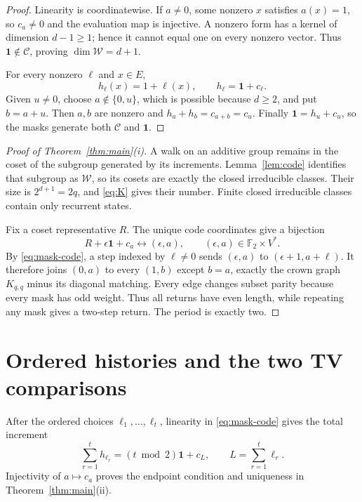 \documentclass[a4paper,10pt]{amsart}
\theoremstyle{remark}
\newcommand{\F}{\mathbb F}
\newcommand{\one}{\mathbf 1}
\newcommand{\cC}{\mathcal C}
\newcommand{\cW}{\mathcal W}
\begin{document}
\begin{proof}
Linearity is coordinatewise.  If $a\ne0$, some nonzero $x$ satisfies
$a(x)=1$, so $c_a\ne0$ and the evaluation map is injective.  A nonzero form
has a kernel of dimension $d-1\ge1$; hence it cannot equal one on every
nonzero vector.  Thus $\one\notin\cC$, proving $\dim\cW=d+1$.

For every nonzero $\ell$ and $x\in E$,
\begin{equation}\label{eq:mask-code}
          h_\ell(x)=1+\ell(x),\qquad h_\ell=\one+c_\ell.
\end{equation}
Given $u\ne0$, choose $a\notin\{0,u\}$, which is possible because $d\ge2$,
and put $b=a+u$.  Then $a,b$ are nonzero and
$h_a+h_b=c_{a+b}=c_u$.  Finally $\one=h_u+c_u$, so the masks generate both
$\cC$ and $\one$.
\end{proof}

\begin{proof}[Proof of Theorem~\ref{thm:main}(i)]
A walk on an additive group remains in the coset of the subgroup generated
by its increments.  Lemma~\ref{lem:code} identifies that subgroup as
$\cW$, so its cosets are exactly the closed irreducible classes.  Their size
is $2^{d+1}=2q$, and \eqref{eq:K} gives their number.  Finite closed
irreducible classes contain only recurrent states.

Fix a coset representative $R$.  The unique code coordinates give a
bijection
\begin{equation}\label{eq:crown-coordinates}
 R+\epsilon\one+c_a\longleftrightarrow(\epsilon,a),
 \qquad (\epsilon,a)\in\F_2\times V^*.
\end{equation}
By \eqref{eq:mask-code}, a step indexed by $\ell\ne0$ sends
$(\epsilon,a)$ to $(\epsilon+1,a+\ell)$.  It therefore joins
$(0,a)$ to every $(1,b)$ except $b=a$, exactly the crown graph
$K_{q,q}$ minus its diagonal matching.  Every edge changes subset parity
because every mask has odd weight.  Thus all returns have even length, while
repeating any mask gives a two-step return.  The period is exactly two.
\end{proof}

\section{Ordered histories and the two TV comparisons}

After the ordered choices $\ell_1,\ldots,\ell_t$, linearity in
\eqref{eq:mask-code} gives the total increment
\begin{equation}\label{eq:increment}
 \sum_{r=1}^t h_{\ell_r}=(t\bmod2)\one+c_L,
 \qquad L=\sum_{r=1}^t\ell_r.
\end{equation}
Injectivity of $a\mapsto c_a$ proves the endpoint condition and uniqueness
in Theorem~\ref{thm:main}(ii).
\end{document}
